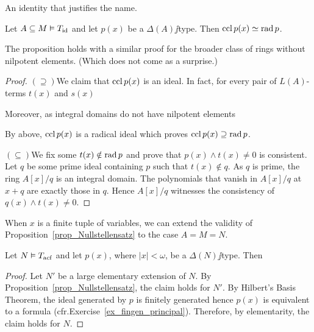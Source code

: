 \documentclass[creche.tex]{subfiles}
\begin{document}

An identity that justifies the name.



\begin{proposition}\label{prop_chiusura-radicale}
Let $A\subseteq M\models T_{\rm id}$ and let $p(x)$ be a $\Delta(A)\jj$type. Then $\ccl\,p(x)\simeq\rad p$.
\end{proposition}
The proposition holds with a similar proof for the broader class of rings without nilpotent elements. (Which does not come as a surprise.)
\begin{proof}
$(\supseteq)$\quad We claim that $\ccl\,p(x)$ is an ideal. In fact, for every pair of $L(A)$-terms $t(x)$ and $s(x)$



Moreover, as integral domains do not have nilpotent elements


By \ssf{\#} above, $\ccl\,p(x)$ is a radical ideal which proves $\ccl\,p(x)\supseteq \rad p$.

$(\subseteq)$\quad We fix some $t(x)\notin\rad p$ and prove that $p(x)\wedge t(x)\neq0$ is consistent. Let $q$ be some prime ideal containing $p$ such that $t(x)\notin q$.  As $q$ is prime, the ring $A[x]/q$ is an integral domain. The polynomials that vanish in  $A[x]/q$ at $x+q$ are exactly those in $q$. Hence $A[x]/q$ witnesses the consistency of $q(x)\wedge t(x)\neq0$.
\end{proof}

When $x$ is a finite tuple of variables, we can extend the validity of Proposition~\ref{prop_Nullstellensatz} to the case $A=M=N$.

\begin{corollary}\label{coroll_Nullstellensatz}
Let $N\models T_{\rm acf}$ and let $p(x)$, where $|x|<\omega$, be a $\Delta(N)\jj$type. Then


\end{corollary}



\begin{proof}
Let $N'$ be a large elementary extension of $N$. By Proposition~\ref{prop_Nullstellensatz}, the claim holds for $N'$. By Hilbert's Basis Theorem, the ideal generated by $p$ is finitely generated hence $p(x)$ is equivalent to a formula (cfr.\@ Exercise~\ref{ex_fingen_principal}). Therefore, by elementarity, the claim holds for $N$.
\end{proof}
\end{document}
